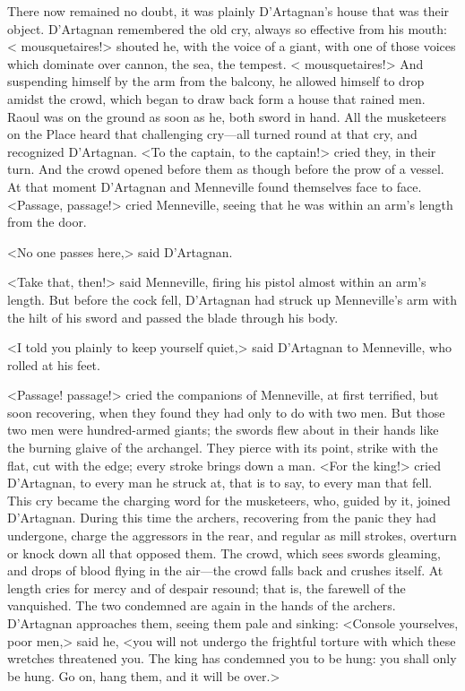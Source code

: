 There now remained no doubt, it was plainly D'Artagnan's house that was their object. D'Artagnan remembered the old cry, always so effective from his mouth: < mousquetaires!> shouted he, with the voice of a giant, with one of those voices which dominate over cannon, the sea, the tempest. < mousquetaires!> And suspending himself by the arm from the balcony, he allowed himself to drop amidst the crowd, which began to draw back form a house that rained men. Raoul was on the ground as soon as he, both sword in hand. All the musketeers on the Place heard that challenging cry—all turned round at that cry, and recognized D'Artagnan. <To the captain, to the captain!> cried they, in their turn. And the crowd opened before them as though before the prow of a vessel. At that moment D'Artagnan and Menneville found themselves face to face. <Passage, passage!> cried Menneville, seeing that he was within an arm's length from the door.

<No one passes here,> said D'Artagnan.

<Take that, then!> said Menneville, firing his pistol almost within an arm's length. But before the cock fell, D'Artagnan had struck up Menneville's arm with the hilt of his sword and passed the blade through his body.

<I told you plainly to keep yourself quiet,> said D'Artagnan to Menneville, who rolled at his feet.

<Passage! passage!> cried the companions of Menneville, at first terrified, but soon recovering, when they found they had only to do with two men. But those two men were hundred-armed giants; the swords flew about in their hands like the burning glaive of the archangel. They pierce with its point, strike with the flat, cut with the edge; every stroke brings down a man. <For the king!> cried D'Artagnan, to every man he struck at, that is to say, to every man that fell. This cry became the charging word for the musketeers, who, guided by it, joined D'Artagnan. During this time the archers, recovering from the panic they had undergone, charge the aggressors in the rear, and regular as mill strokes, overturn or knock down all that opposed them. The crowd, which sees swords gleaming, and drops of blood flying in the air—the crowd falls back and crushes itself. At length cries for mercy and of despair resound; that is, the farewell of the vanquished. The two condemned are again in the hands of the archers. D'Artagnan approaches them, seeing them pale and sinking: <Console yourselves, poor men,> said he, <you will not undergo the frightful torture with which these wretches threatened you. The king has condemned you to be hung: you shall only be hung. Go on, hang them, and it will be over.>

